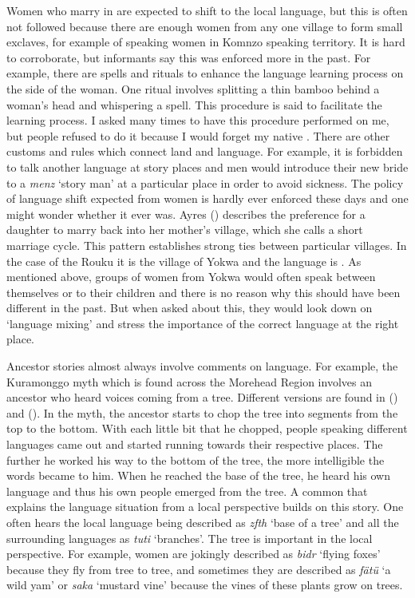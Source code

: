 Women who marry in are expected to shift to the local language, but this is often not followed because there are enough women from any one village to form small exclaves, for example of  speaking women in Komnzo speaking territory. It is hard to corroborate, but informants say this was enforced more in the past. For example, there are spells and rituals to enhance the language learning process on the side of the woman. One ritual involves splitting a thin bamboo behind a woman's head and whispering a spell. This procedure is said to facilitate the learning process. I asked many times to have this procedure performed on me, but people refused to do it because I would forget my native . There are other customs and rules which connect land and language. For example, it is forbidden to talk another language at story places and men would introduce their new bride to a \textit{menz} `story man' at a particular place in order to avoid sickness. The policy of language shift expected from women is hardly ever enforced these days and one might wonder whether it ever was. Ayres (\citeyear[226]{Ayres:ws}) describes the preference for a daughter to marry back into her mother's village, which she calls a short marriage cycle. This pattern establishes strong ties between particular villages. In the case of the Rouku it is the village of Yokwa and the language is . As mentioned above, groups of women from Yokwa would often speak  between themselves or to their children and there is no reason why this should have been different in the past. But when asked about this, they would look down on `language mixing' and stress the importance of the correct language at the right place.

Ancestor stories almost always involve comments on language. For example, the Kuramonggo myth which is found across the Morehead Region involves an ancestor who heard voices coming from a tree. Different versions are found in (\citealt[299]{Williams:1936transfly}) and (\citealt[102]{Ayres:ws}). In the myth, the ancestor starts to chop the tree into segments from the top to the bottom. With each little bit that he chopped, people speaking different languages came out and started running towards their respective places. The further he worked his way to the bottom of the tree, the more intelligible the words became to him. When he reached the base of the tree, he heard his own language and thus his own people emerged from the tree. A common  that explains the language situation from a local perspective builds on this story. One often hears the local language being described as \emph{zfth} `base of a tree' and all the surrounding languages as \emph{tuti} `branches'. The tree  is important in the local perspective. For example, women are jokingly described as \textit{bidr} `flying foxes' because they fly from tree to tree, and sometimes they are described as \textit{fätü} `a wild yam' or \textit{saka} `mustard vine' because the vines of these plants grow on trees.

